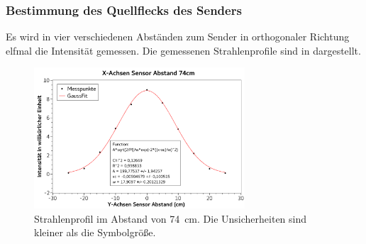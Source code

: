 \documentclass[
	a4paper,
	12pt,
	pagesize,
	ngerman
]{scrartcl}
\begin{document}
	\subsubsection{Bestimmung des Quellflecks des Senders}
	Es wird in vier verschiedenen Abständen zum Sender in orthogonaler Richtung elfmal die Intensität gemessen.
	Die gemessenen Strahlenprofile sind in  dargestellt. 
	\begin{figure}[H]
		\includegraphics[width=0.7\textwidth]{fig_74cm_gauss}
		\centering
		\caption{Strahlenprofil im Abstand von \SI{74}{cm}. Die Unsicherheiten sind kleiner als die Symbolgröße.}
		\label{fig_74cm}
		\centering
	\end{figure}
\end{document}

